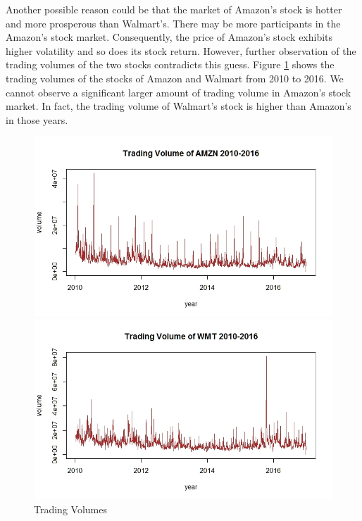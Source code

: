 \documentclass[paper=a4, fontsize=11pt]{article}
\begin{document}
Another possible reason could be that the market of Amazon's stock is hotter and more prosperous than Walmart's. There may be more participants in the Amazon's stock market. Consequently, the price of Amazon's stock exhibits higher volatility and so does its stock return. However, further observation of the trading volumes of the two stocks contradicts this guess. Figure \ref{volume} shows the trading volumes of the stocks of Amazon and Walmart from 2010 to 2016. We cannot observe a significant larger amount of trading volume in Amazon's stock market. In fact, the trading volume of Walmart's stock is higher than Amazon's in those years.

\begin{figure}[!htbp]
\begin{minipage}[!htbp]{0.5\linewidth}
\centering
\includegraphics[scale = 0.45]{img/volume_AMZN}
\end{minipage}
\begin{minipage}[!htbp]{0.5\linewidth}
\centering
\includegraphics[scale = 0.45]{img/volume_WMT}
\end{minipage}
\caption{Trading Volumes}
\label{volume}
\end{figure}
\end{document}
